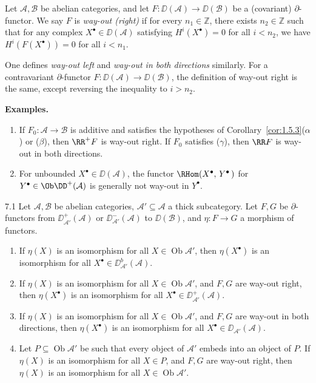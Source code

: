 \begin{definition*}
Let $\mathcal{A},\mathcal{B}$ be abelian categories, and let $F\colon\DD(\mathcal{A})\to\DD(\mathcal{B})$ be a (covariant) $\partial$-functor.
We say $F$ is \emph{way-out (right)} if for every $n_1\in\mathbb{Z}$, there exists $n_2\in\mathbb{Z}$ such that
for any complex $X^\bullet\in\DD(\mathcal{A})$ satisfying $H^i(X^\bullet)=0$ for all $i<n_2$,
we have $H^i(F(X^\bullet))=0$ for all $i<n_1$.

One defines \emph{way-out left} and \emph{way-out in both directions} similarly.
For a contravariant $\partial$-functor $F\colon\DD(\mathcal{A})\to\DD(\mathcal{B})$,
the definition of way-out right is the same, except reversing the inequality to $i>n_2$.
\end{definition*}

\textbf{Examples.}
\begin{enumerate}
\item If $F_0\colon\mathcal{A}\to\mathcal{B}$ is additive and satisfies the hypotheses of Corollary~\ref{cor:1.5.3}($\alpha$) or ($\beta$),
then $\RR^+F$ is way-out right.
If $F_0$ satisfies ($\gamma$), then $\RR F$ is way-out in both directions.

\item For unbounded $X^\bullet\in\DD(\mathcal{A})$, the functor
$\RHom(X^\bullet,\,Y^\bullet\,)$ for  $Y^\bullet \in \Ob \DD^+(\mathcal{A})$
is generally not way-out in $Y^\bullet$.
\end{enumerate}

\begin{bookproposition}{7.1}\label{prop:1.7.1}
Let $\mathcal{A},\mathcal{B}$ be abelian categories, $\mathcal{A}'\subseteq\mathcal{A}$ a thick subcategory.
Let $F,G$  be $\partial$-functors from $\DD_{\mathcal{A}'}^+(\mathcal{A})$ or $\DD_{\mathcal{A}'}^-(\mathcal{A})$ to $\DD(\mathcal{B})$,
and $\eta\colon F\to G$ a morphism of functors.
\begin{enumerate}
\item[(i)] If $\eta(X)$ is an isomorphism for all $X\in\operatorname{Ob}\mathcal{A}'$,
then $\eta(X^\bullet)$ is an isomorphism for all $X^\bullet\in\DD_{\mathcal{A}'}^b(\mathcal{A})$.

\item[(ii)] If $\eta(X)$ is an isomorphism for all $X\in\operatorname{Ob}\mathcal{A}'$,
and $F,G$ are way-out right,
then $\eta(X^\bullet)$ is an isomorphism for all $X^\bullet\in\DD_{\mathcal{A}'}^+(\mathcal{A})$.

\item[(iii)] If $\eta(X)$ is an isomorphism for all $X\in\operatorname{Ob}\mathcal{A}'$,
and $F,G$ are way-out in both directions,
then $\eta(X^\bullet)$ is an isomorphism for all $X^\bullet\in\DD_{\mathcal{A}'}(\mathcal{A})$.

\item[(iv)] Let $P\subseteq\operatorname{Ob}\mathcal{A}'$ be such that every object of $\mathcal{A}'$ embeds into an object of $P$.
If $\eta(X)$ is an isomorphism for all $X\in P$, and $F,G$ are way-out right,
then $\eta(X)$ is an isomorphism for all $X\in\operatorname{Ob}\mathcal{A}'$.
\end{enumerate}
\end{bookproposition}

